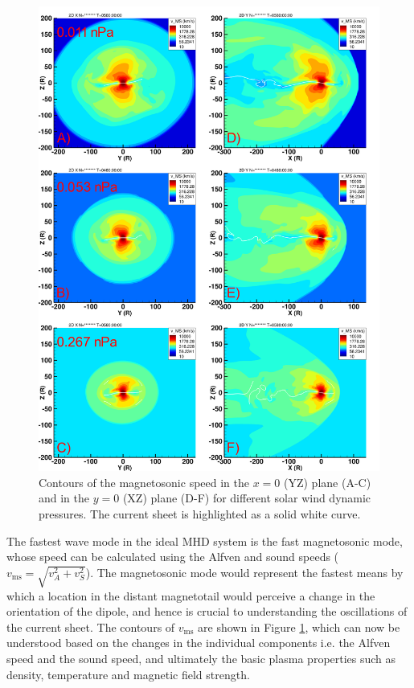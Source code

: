 \begin{figure}
    \centering
    \includegraphics[height=0.9\textheight]{images5/compare_runs_currentsheet_MagnetosonicSpeed.png}
    \caption{Contours of the magnetosonic speed in the $x=0$ (YZ) plane (A-C) and in the $y=0$ (XZ) plane (D-F) for different solar wind dynamic pressures. The current sheet is highlighted as a solid white curve.}
    \label{fig:chp5-comparison-slices-magnetosonic}
\end{figure}

The fastest wave mode in the ideal MHD system is the fast magnetosonic mode, whose speed can be calculated using the Alfven and sound speeds ($v_\text{ms} = \sqrt{v_A^2 + v_S^2}$). The magnetosonic mode would represent the fastest means by which a location in the distant magnetotail would perceive a change in the orientation of the dipole, and hence is crucial to understanding the oscillations of the current sheet. The contours of $v_\text{ms}$ are shown in Figure \ref{fig:chp5-comparison-slices-magnetosonic}, which can now be understood based on the changes in the individual components i.e. the Alfven speed and the sound speed, and ultimately the basic plasma properties such as density, temperature and magnetic field strength. 

